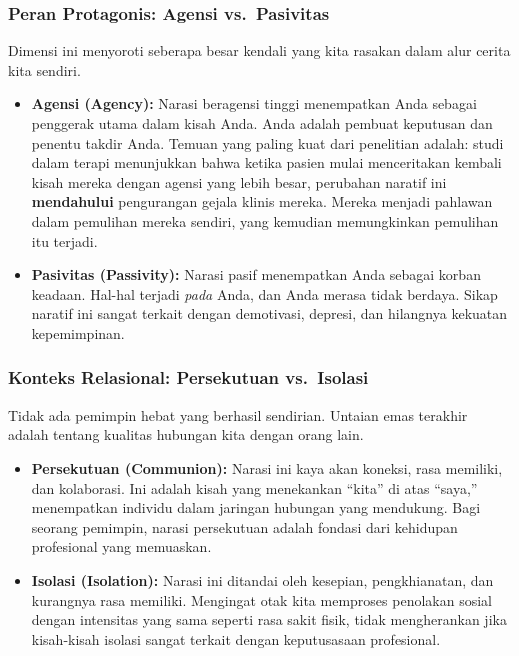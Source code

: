 \documentclass[
  letterpaper,
  DIV=11,
  numbers=noendperiod]{scrreprt}
\begin{document}
\subsubsection{Peran Protagonis: Agensi
vs.~Pasivitas}\label{peran-protagonis-agensi-vs.-pasivitas}

Dimensi ini menyoroti seberapa besar kendali yang kita rasakan dalam
alur cerita kita sendiri.

\begin{itemize}
\item
  \textbf{Agensi (Agency):} Narasi beragensi tinggi menempatkan Anda
  sebagai penggerak utama dalam kisah Anda. Anda adalah pembuat
  keputusan dan penentu takdir Anda. Temuan yang paling kuat dari
  penelitian adalah: studi dalam terapi menunjukkan bahwa ketika pasien
  mulai menceritakan kembali kisah mereka dengan agensi yang lebih
  besar, perubahan naratif ini \textbf{mendahului} pengurangan gejala
  klinis mereka. Mereka menjadi pahlawan dalam pemulihan mereka sendiri,
  yang kemudian memungkinkan pemulihan itu terjadi.
\item
  \textbf{Pasivitas (Passivity):} Narasi pasif menempatkan Anda sebagai
  korban keadaan. Hal-hal terjadi \emph{pada} Anda, dan Anda merasa
  tidak berdaya. Sikap naratif ini sangat terkait dengan demotivasi,
  depresi, dan hilangnya kekuatan kepemimpinan.
\end{itemize}

\subsubsection{Konteks Relasional: Persekutuan
vs.~Isolasi}\label{konteks-relasional-persekutuan-vs.-isolasi}

Tidak ada pemimpin hebat yang berhasil sendirian. Untaian emas terakhir
adalah tentang kualitas hubungan kita dengan orang lain.

\begin{itemize}
\item
  \textbf{Persekutuan (Communion):} Narasi ini kaya akan koneksi, rasa
  memiliki, dan kolaborasi. Ini adalah kisah yang menekankan ``kita'' di
  atas ``saya,'' menempatkan individu dalam jaringan hubungan yang
  mendukung. Bagi seorang pemimpin, narasi persekutuan adalah fondasi
  dari kehidupan profesional yang memuaskan.
\item
  \textbf{Isolasi (Isolation):} Narasi ini ditandai oleh kesepian,
  pengkhianatan, dan kurangnya rasa memiliki. Mengingat otak kita
  memproses penolakan sosial dengan intensitas yang sama seperti rasa
  sakit fisik, tidak mengherankan jika kisah-kisah isolasi sangat
  terkait dengan keputusasaan profesional.
\end{itemize}
\end{document}
